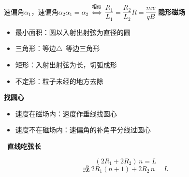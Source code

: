 速偏角$\alpha_1$，速偏角$\alpha_2$\quad $\alpha_1=\alpha_2\ \overset{\text{相似}}{\Longleftrightarrow}\ \dfrac{R_1}{L_1}=\dfrac{R_2}{L_2}$\quad $R=\dfrac{mv}{qB}$
\textbf{隐形磁场}
\begin{itemize}
\item 最小面积：圆\quad 以入射出射弦为直径的圆
\item 三角形：等边$\triangle$\ 等边三角形
\item 矩形：入射出射弦为长，切弧成形
\item 不定形：粒子未经的地方去除
\end{itemize}
\textbf{找圆心}
\begin{itemize}
\item 速度在磁场内：速度作垂线找圆心
\item 速度不在磁场内：速偏角的补角平分线过圆心
\end{itemize}
\ \textbf{直线吃弦长}

\[ (2R_1+2R_2)\,n=L \]
\[ \text{或}\ 2R_1(n+1)+2R_2\,n=L \]


